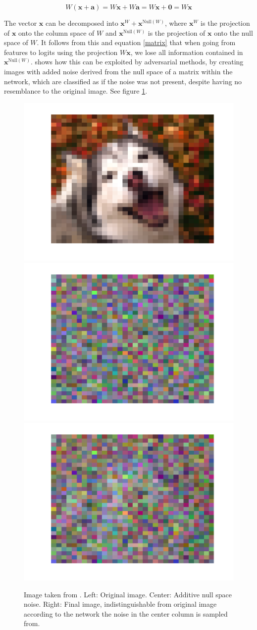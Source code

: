 \documentclass[UKenglish]{uiomasterthesis} %
\theoremstyle{definition}
\begin{document}
\begin{equation}
W (\bm{x} + \bm{a}) = W \bm{x} + W \bm{a} = W \bm{x} + \bm{0} = W \bm{x}
\label{matrix}
\end{equation}

The vector $\bm{x}$ can be decomposed into $\bm{x}^W + \bm{x}^{\text{Null}(W)}$, where $\bm{x}^W$ is the projection of $\bm{x}$ onto the column space of $W$ and $\bm{x}^{\text{Null}(W)}$ is the projection of $\bm{x}$ onto the null space of $W$. It follows from this and equation \ref{matrix} that when going from features to logits using the projection $W \bm{x}$, we lose all information contained in $\bm{x}^{\text{Null}(W)}$. \cite{nusa} shows how this can be exploited by adversarial methods, by creating images with added noise derived from the null space of a matrix within the network, which are classified as if the noise was not present, despite having no resemblance to the original image. See figure \ref{dog}.

\begin{figure}[hbt]
    \centering
    \includegraphics[width=0.32\linewidth,trim={1.25cm 1.25cm 1.25cm 1.25cm},clip]{figure/OrigImage.pdf}
    \includegraphics[width=0.32\linewidth,trim={1.25cm 1.25cm 1.25cm 1.25cm},clip]{figure/PureNoise.pdf}
    \includegraphics[width=0.32\linewidth,trim={1.25cm 1.25cm 1.25cm 1.25cm},clip]{figure/NoiseAdded.pdf}
    \caption{Image taken from \cite{nusa}. Left: Original image. Center: Additive null space noise. Right: Final image, indistinguishable from original image according to the network the noise in the center column is sampled from.}
    \label{dog}
\end{figure}
\end{document}
